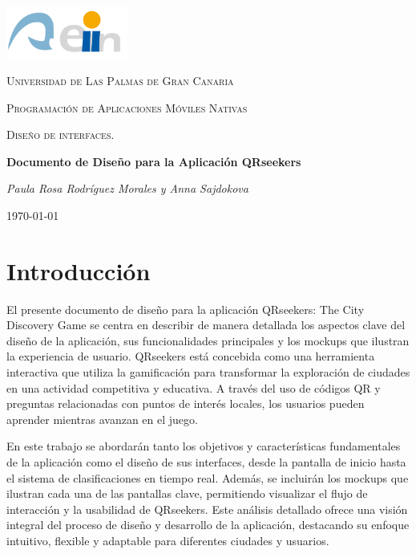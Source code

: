 \documentclass[letterpaper, 12pt]{report}
\begin{document}
\begin{titlepage}
	\centering
	\includegraphics[width=0.3\textwidth]{eii_ulpgc.png}\par\vspace{1cm}
	{\scshape\LARGE Universidad de Las Palmas de Gran Canaria \par}
	\vspace{1cm}
	{\scshape\Large Programaci\'on de Aplicaciones M\'oviles Nativas \par}
	\vspace{.2cm}
    {\scshape\Large Diseño de interfaces. \par}
	\vspace{1cm}
	{\Large\bfseries Documento de Diseño para la Aplicación QRseekers\par}
	\vspace{1cm}
	{\itshape Paula Rosa Rodríguez Morales y Anna Sajdokova \par}
	\vfill

	\vfill
	{\large \today\par}
\end{titlepage}
\tableofcontents
\newpage

\section{Introducción}
El presente documento de diseño para la aplicación QRseekers: The City Discovery Game se centra en describir de manera detallada los aspectos clave del diseño de la aplicación, sus funcionalidades principales y los mockups que ilustran la experiencia de usuario. QRseekers está concebida como una herramienta interactiva que utiliza la gamificación para transformar la exploración de ciudades en una actividad competitiva y educativa. A través del uso de códigos QR y preguntas relacionadas con puntos de interés locales, los usuarios pueden aprender mientras avanzan en el juego.

En este trabajo se abordarán tanto los objetivos y características fundamentales de la aplicación como el diseño de sus interfaces, desde la pantalla de inicio hasta el sistema de clasificaciones en tiempo real. Además, se incluirán los mockups que ilustran cada una de las pantallas clave, permitiendo visualizar el flujo de interacción y la usabilidad de QRseekers. Este análisis detallado ofrece una visión integral del proceso de diseño y desarrollo de la aplicación, destacando su enfoque intuitivo, flexible y adaptable para diferentes ciudades y usuarios.
\end{document}
